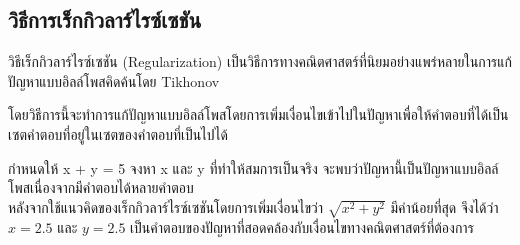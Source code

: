 \subsection{วิธีการเร็กกิวลาร์ไรซ์เซชัน}
\hspace{1cm} วิธีเร็กกิวลาร์ไรซ์เซชัน (Regularization) เป็นวิธีการทางคณิตศาสตร์ที่นิยมอย่างแพร่หลายในการแก้ปัญหาแบบอิลล์โพสคิดค้นโดย Tikhonov \cite{ref:regularization} 

\hspace{1cm} โดยวิธีการนี้จะทำการแก้ปัญหาแบบอิลล์โพสโดยการเพิ่มเงื่อนไขเข้าไปในปัญหาเพื่อให้คำตอบที่ได้เป็นเซตคำตอบที่อยู่ในเซตของคำตอบที่เป็นไปได้ 

\begin{Example}
    กำหนดให้ x + y = 5 จงหา x และ y ที่ทำให้สมการเป็นจริง
    จะพบว่าปัญหานี้เป็นปัญหาแบบอิลล์โพสเนื่องจากมีคำตอบได้หลายคำตอบ \\
    \hspace*{1cm} หลังจากใช้แนวคิดของเร็กกิวลาร์ไรซ์เซชันโดยการเพิ่มเงื่อนไขว่า $\sqrt{x^2+y^2}$ มีค่าน้อยที่สุด
    จึงได้ว่า  $x = 2.5$ และ $y = 2.5$ เป็นคำตอบของปัญหาที่สอดคล้องกับเงื่อนไขทางคณิตศาสตร์ที่ต้องการ
\end{Example}